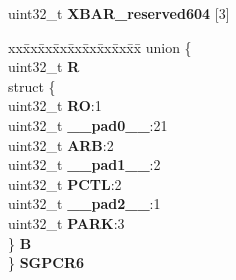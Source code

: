 \begin{DoxyCompactItemize}
\begin{tabbing}
\end{tabbing}\item 
\mbox{\label{structXBAR__tag_aee3931212a92c5f738daf97458f66664}} 
uint32\+\_\+t {\bfseries X\+B\+A\+R\+\_\+reserved604} \mbox{[}3\mbox{]}
\item 
\mbox{\label{structXBAR__tag_a8d5d6c500ae811534677673acf8250c3}} 
\begin{tabbing}
xx\=xx\=xx\=xx\=xx\=xx\=xx\=xx\=xx\=\kill
union \{\\
\>uint32\_t {\bfseries R}\\
\>struct \{\\
\>\>uint32\_t {\bfseries RO}:1\\
\>\>uint32\_t {\bfseries \_\_pad0\_\_}:21\\
\>\>uint32\_t {\bfseries ARB}:2\\
\>\>uint32\_t {\bfseries \_\_pad1\_\_}:2\\
\>\>uint32\_t {\bfseries PCTL}:2\\
\>\>uint32\_t {\bfseries \_\_pad2\_\_}:1\\
\>\>uint32\_t {\bfseries PARK}:3\\
\>\} {\bfseries B}\\
\} {\bfseries SGPCR6}\\


\end{tabbing}
\end{DoxyCompactItemize}
